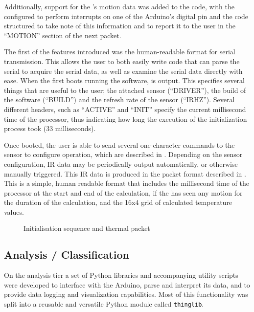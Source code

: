 \documentclass[../thesis/thesis.tex]{subfiles}
\begin{document}
Additionally, support for the \pir's motion data was added to the code, with the \pir configured to perform interrupts on one of the Arduino's digital pin and the code structured to take note of this information and to report it to the user in the ``MOTION'' section of the next packet.

The first of the features introduced was the human-readable format for serial transmission. This allows the user to both easily write code that can parse the serial to acquire the serial data, as well as examine the serial data directly with ease. When the \ard first boots running the software,  is output. This specifies several things that are useful to the user; the attached sensor (``DRIVER''), the build of the software (``BUILD'') and the refresh rate of the sensor (``IRHZ''). Several different headers, such as ``ACTIVE'' and ``INIT'' specify the current millisecond time of the processor, thus indicating how long the execution of the initialization process took (33 milliseconds).

Once booted, the user is able to send several one-character commands to the sensor to configure operation, which are described in . Depending on the sensor configuration, IR data may be periodically output automatically, or otherwise manually triggered. This IR data is produced in the packet format described in . This is a simple, human readable format that includes the millisecond time of the processor at the start and end of the calculation, if the \pir has seen any motion for the duration of the calculation, and the 16x4 grid of calculated temperature values.

\begin{figure}
 \centering

\caption{Initialisation sequence and thermal packet}
\label{fig:code:initseq}
\end{figure}

\subsection{Analysis / Classification}

On the analysis tier a set of Python libraries and accompanying utility scripts were developed to interface with the Arduino, parse and interpret its data, and to provide data logging and visualization capabilities. Most of this functionality was split into a reusable and versatile Python module called \texttt{thinglib}.
\end{document}
